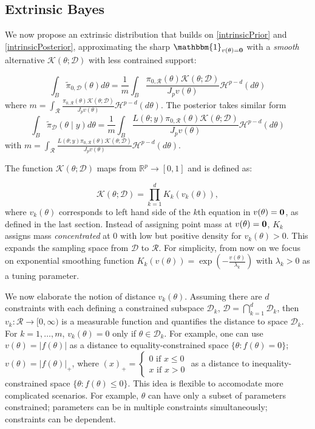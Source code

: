 \documentclass[10pt]{article}
\newcommand{\bb}[1]{\mathbb{#1}}
\newcommand{\mc}[1]{\mathcal{#1}}
\DeclareMathOperator{\1}{\mathbbm{1}}
\begin{document}
\subsection{Extrinsic Bayes}
We now propose an extrinsic distribution that builds on \eqref{intrinsicPrior} and \eqref{intrinsicPosterior}, approximating the sharp $\mathbbm{1}_{v(\theta)= \bf 0}$ with a {\em smooth} alternative $\mc{K}( \theta; \mc D)$ with less contrained support:


\begin{equation}
\label{extrinsicPrior}
	\int_{B}\tilde \pi_{0,\mc D}(\theta)d\theta= \frac{1}{m}\int_{B} \frac{\pi_{0,\mc R}(\theta) \mc{K}( \theta; \mc D)   }{J_p v(\theta)}\mc H^{p-d}(d\theta)
\end{equation}
where $m=\int_{\mc R} \frac{\pi_{0,\mc R}(\theta) \mc{K}( \theta; \mc D)   }{J_p v(\theta)}\mc H^{p-d}(d\theta)$. The posterior takes similar form
\begin{equation}
\label{extrinsicPosterior}
	\int_{B}\tilde \pi_{\mc D}(\theta \mid y)d\theta= \frac{1}{m}\int_{B} \frac{L(\theta;y)\pi_{0,\mc R}(\theta) \mc{K}( \theta; \mc D)   }{J_p v(\theta)}\mc H^{p-d}(d\theta)
\end{equation}
with $m=	\int_{\mc R} \frac{L(\theta;y)\pi_{0,\mc R}(\theta) \mc{K}( \theta; \mc D)   }{J_p v(\theta)}\mc H^{p-d}(d\theta)$.
 
The function $\mc K(\theta;\mc D)$ maps from $\bb R^p\rightarrow [0,1]$ and is defined as:

\begin{equation}
\label{smoothing}
\mc K(\theta; \mc D)= \prod_{k=1}^d K_k(v_k(\theta)),
\end{equation}
where $v_k(\theta)$ corresponds to left hand side of the $k$th equation in $v(\theta)=\bf 0$, as defined in the last section. Instead of assigning point mass at $v(\theta)=\bf 0$, $K_k$ assigns mass {\it concentrated} at $0$ with low but positive density for ${v_k(\theta)>0}$. This expands the sampling space from $\mc D$ to $\mc R$. For simplicity, from now on we focus on exponential smoothing function $K_k(v(\theta))=\exp(-\frac{v(\theta)}{\lambda_k})$ with $\lambda_k>0$ as a tuning parameter.

We now elaborate the notion of distance $v_k(\theta)$. Assuming there are $d$ constraints with each defining a constrained subspace $\mc D_k$, $\mc D = \bigcap_{k=1}^d\mc D_k$, then $v_k: \mc R \rightarrow [0,\infty)$ is a measurable function and quantifies the distance to space $\mc D_k$. For $k=1,\ldots,m$, $v_k(\theta)=0$ only if $\theta\in \mc D_k$. For example, one can use $v(\theta)=|f(\theta)|$ as a distance to equality-constrained space  $\{\theta:f(\theta)=0\}$; $v(\theta)=|f(\theta)|_+$, where $(x)_+ = \left\{\begin{array}{cc}  0 \text{ if } x\le 0 \\ x \text{ if } x> 0\end{array}\right.$ as a distance to inequality-constrained space  $\{\theta:f(\theta) \le 0\}$. This idea is flexible to accomodate more complicated scenarios. For example, $\theta$ can have only a subset of parameters constrained; parameters can be in multiple constraints simultaneously; constraints can be dependent. 
\end{document}
